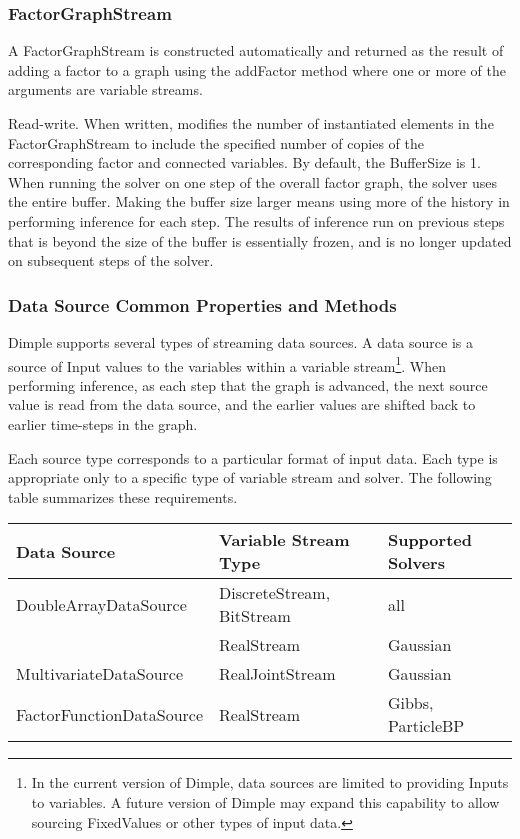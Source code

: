 \subsubsection{FactorGraphStream}

A FactorGraphStream is constructed automatically and returned as the result of adding a factor to a graph using the addFactor method where one or more of the arguments are variable streams.


\label{sec:FactorGraphStream.BufferSize}

Read-write. When written, modifies the number of instantiated elements in the FactorGraphStream to include the specified number of copies of the corresponding factor and connected variables.  By default, the BufferSize is 1.  When running the solver on one step of the overall factor graph, the solver uses the entire buffer.  Making the buffer size larger means using more of the history in performing inference for each step.  The results of inference run on previous steps that is beyond the size of the buffer is essentially frozen, and is no longer updated on subsequent steps of the solver.


\subsubsection{Data Source Common Properties and Methods}
\label{sec:DataSource}

Dimple supports several types of streaming data sources.  A data source is a source of Input values to the variables within a variable stream\footnote{In the current version of Dimple, data sources are limited to providing Inputs to variables.  A future version of Dimple may expand this capability to allow sourcing FixedValues or other types of input data.}.  When performing inference, as each step that the graph is advanced, the next source value is read from the data source, and the earlier values are shifted back to earlier time-steps in the graph.

Each source type corresponds to a particular format of input data.  Each type is appropriate only to a specific type of variable stream and solver.  The following table summarizes these requirements.

\begin{longtable} {l | l | l}
Data Source & Variable Stream Type & Supported Solvers \\
\hline
\endhead
DoubleArrayDataSource & DiscreteStream, BitStream & all \\
 & RealStream & Gaussian \\
MultivariateDataSource & RealJointStream & Gaussian \\
FactorFunctionDataSource & RealStream & Gibbs, ParticleBP \\
\end{longtable} 

